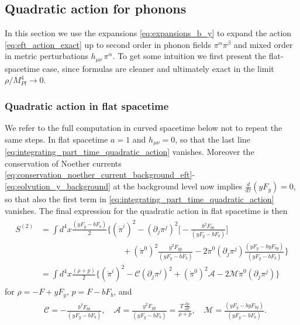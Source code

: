 \subsection{Quadratic action for phonons}
%
In this section we use the expansions \eqref{eq:expansions_b_y} to expand the action \eqref{eq:eft_action_exact} up to second order in phonon fields $\pi^\alpha \pi^\beta$ and mixed order in metric perturbations $h_{\mu\nu}\,\pi^\alpha$.
To get some intuition we first present the flat-spacetime case, since formulas are cleaner and  ultimately exact in the limit $\rho/ M_{Pl}^{4}\to0$.

\subsubsection{Quadratic action in flat spacetime}
%
We refer to the full computation in curved spacetime below not to repeat the same steps.
In flat spacetime $a=1$ and $h_{\mu\nu}=0$, so that the last line \eqref{eq:integrating_part_time_quadratic_action} vanishes.
Moreover the conservation of Noether currents \eqref{eq:conservation_noether_current_background_eft}-\eqref{eq:eolvution_y_background} at the background level now implies $\tfrac{d}{d\tau}(yF_y)=0$, so that also the first term in \eqref{eq:integrating_part_time_quadratic_action} vanishes.
The final expression for the quadratic action in flat spacetime is then
{\small\begin{align}
\begin{aligned}
    S^{(2)}&= \int d^4x \frac{(yF_y-bF_b)}{2}\bigg\{(\dot{\pi}^i)^2 - (\partial_j\pi^j)^2\Big[-\frac{b^2F_{bb}}{(yF_y-bF_b)}\Big]\\
    &\qquad\qquad\qquad\qquad\qquad+(\dot{\pi}^0)^2 \frac{y^2F_{yy}}{(yF_y-bF_b)}
    - 2\dot{\pi}^0 (\partial_j \pi^j) \frac{(yF_y-byF_{by})}{(yF_y-bF_b)}
    \bigg\}\\
    &=\int d^4x \frac{(\rho+p)}{2}\bigg\{(\dot{\pi}^i)^2 - \mathcal{C} (\partial_j\pi^j)^2 
    + (\dot{\pi}^0)^2 \mathcal{A}
    - 2\mathcal{M}\dot{\pi}^0 (\partial_j \pi^j) 
    \bigg\}
\end{aligned}
\end{align}}
for $\rho= -F + y F_y$, $p= F - b F_b$, and 
{\small\begin{align}
\begin{aligned}
    &\mathcal{C} = -\frac{b^2F_{bb}}{(yF_y-bF_b)},\quad 
    \mathcal{A} = \frac{y^2F_{yy}}{(yF_y-bF_b)} = \frac{T\, \frac{\partial\rho }{\partial T}}{\rho+p},\quad
    \mathcal{M} = \frac{(yF_y-byF_{by})}{(yF_y-bF_b)}.
\end{aligned}
\end{align}}
